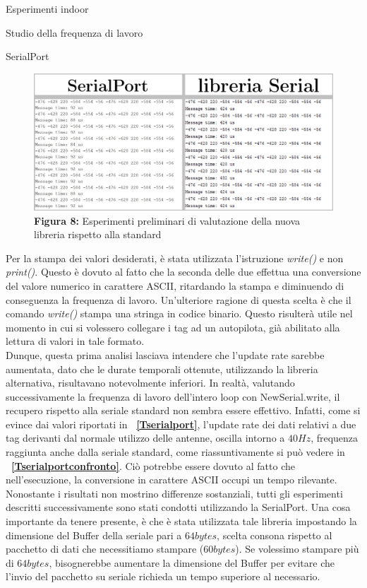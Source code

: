 \documentclass[12pt]{report}
\begin{document}
\begin{section}{Esperimenti indoor}
\begin{subsection}{Studio della frequenza di lavoro}
\begin{subsubsection}{SerialPort}
			\begin{figure}[h]
				\centering
				\includegraphics[scale=0.45]{conf_serial_newSerial}
	 			\caption{\textbf{Figura 8:} Esperimenti preliminari di valutazione della nuova libreria rispetto alla standard}\label{Fconfronto}
			\end{figure}

			Per la stampa dei valori desiderati, è stata utilizzata l’istruzione \textit{write()} e non \textit{print()}. Questo è dovuto al fatto che la seconda delle due effettua una conversione del valore numerico in carattere ASCII, ritardando la stampa e diminuendo di conseguenza la frequenza di lavoro. Un'ulteriore ragione 				di questa scelta è che il comando \textit{write()} stampa una stringa in codice binario. Questo risulterà utile nel momento in cui si volessero collegare i tag ad un autopilota, già abilitato alla lettura di valori in tale formato.\\ 
			Dunque, questa prima analisi lasciava intendere che l'update rate sarebbe aumentata, dato che le durate temporali ottenute, utilizzando la libreria alternativa, risultavano notevolmente inferiori. In realtà, valutando successivamente la frequenza di lavoro dell’intero loop con NewSerial.write, il recupero 								rispetto alla seriale standard non sembra essere effettivo. Infatti, come si evince dai valori riportati in \textbf{\tablename~\ref{Tserialport}}, l'update rate dei dati relativi a due tag derivanti dal normale utilizzo delle antenne, oscilla intorno a $40 Hz$, frequenza raggiunta anche dalla seriale standard, come 						riassuntivamente si può vedere in \textbf{\tablename~\ref{Tserialportconfronto}}. Ciò potrebbe essere dovuto al fatto che nell'esecuzione, la conversione in carattere ASCII occupi un tempo rilevante.
			Nonostante i risultati non mostrino differenze sostanziali, tutti gli esperimenti descritti successivamente sono stati condotti utilizzando la SerialPort. Una cosa importante da tenere presente, è che è stata utilizzata tale libreria impostando la dimensione del Buffer della seriale pari a $64 bytes$, scelta consona 						rispetto al pacchetto di dati che necessitiamo stampare ($60 bytes$). Se volessimo stampare più di $64 bytes$, bisognerebbe aumentare la dimensione del Buffer per evitare che l'invio del pacchetto su seriale richieda un tempo superiore al necessario.				


\end{subsubsection}
\end{subsection}
\end{section}
\end{document}
